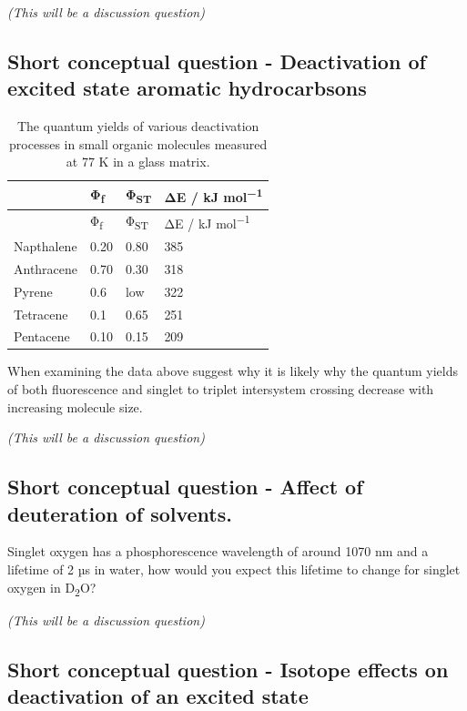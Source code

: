 \documentclass[
]{book}
\begin{document}
\emph{(This will be a discussion question)}

\hypertarget{sec:exhydrocarbons}{%
\subsection{Short conceptual question - Deactivation of excited state aromatic hydrocarbsons}\label{sec:exhydrocarbons}}

\begin{longtable}[]{@{}llll@{}}
\caption{\label{tab:smallmolQY} The quantum yields of various deactivation processes in small organic molecules measured at 77 K in a glass matrix.}\tabularnewline
\toprule
& Φ\textsubscript{f} & Φ\textsubscript{ST} & ΔE / kJ mol\textsuperscript{−1} \\
\midrule
\endfirsthead
\toprule
& Φ\textsubscript{f} & Φ\textsubscript{ST} & ΔE / kJ mol\textsuperscript{−1} \\
\midrule
\endhead
Napthalene & 0.20 & 0.80 & 385 \\
Anthracene & 0.70 & 0.30 & 318 \\
Pyrene & 0.6 & low & 322 \\
Tetracene & 0.1 & 0.65 & 251 \\
Pentacene & 0.10 & 0.15 & 209 \\
\bottomrule
\end{longtable}

When examining the data above suggest why it is likely why the quantum yields of both fluorescence and singlet to triplet intersystem crossing decrease with increasing molecule size.

\emph{(This will be a discussion question)}

\hypertarget{sec:dsolvent}{%
\subsection{Short conceptual question - Affect of deuteration of solvents.}\label{sec:dsolvent}}

Singlet oxygen has a phosphorescence wavelength of around 1070 nm and a lifetime of 2 µs in water, how would you expect this lifetime to change for singlet oxygen in D\textsubscript{2}O?

\emph{(This will be a discussion question)}

\hypertarget{sec:isotope}{%
\subsection{Short conceptual question - Isotope effects on deactivation of an excited state}\label{sec:isotope}}
\end{document}
